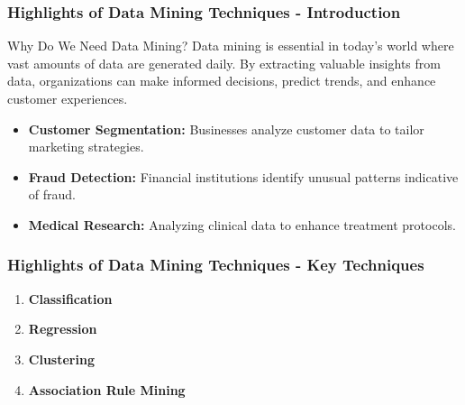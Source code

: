 \documentclass[aspectratio=169]{beamer}
\begin{document}
\begin{frame}[fragile]
    \frametitle{Highlights of Data Mining Techniques - Introduction}
    \begin{block}{Why Do We Need Data Mining?}
        Data mining is essential in today's world where vast amounts of data are generated daily. By extracting valuable insights from data, organizations can make informed decisions, predict trends, and enhance customer experiences.
    \end{block}
    
    \begin{itemize}
        \item \textbf{Customer Segmentation:} Businesses analyze customer data to tailor marketing strategies.
        \item \textbf{Fraud Detection:} Financial institutions identify unusual patterns indicative of fraud.
        \item \textbf{Medical Research:} Analyzing clinical data to enhance treatment protocols.
    \end{itemize}
\end{frame}

\begin{frame}[fragile]
    \frametitle{Highlights of Data Mining Techniques - Key Techniques}
    \begin{enumerate}
        \item \textbf{Classification}
        \item \textbf{Regression}
        \item \textbf{Clustering}
        \item \textbf{Association Rule Mining}
    \end{enumerate}
\end{frame}
\end{document}
